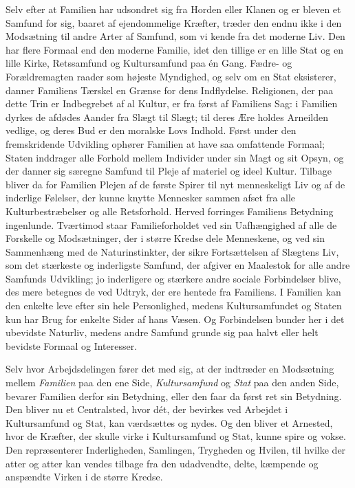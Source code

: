 \documentclass[12pt,a4paper]{article}
\begin{document}
Selv efter at Familien har udsondret sig fra Horden eller Klanen og er bleven
et Samfund for sig, baaret af ejendommelige Kræfter, træder den endnu ikke i
den Modsætning til andre Arter af Samfund, som vi kende fra det moderne Liv.
Den har flere Formaal end den moderne Familie, idet den tillige er en lille
Stat og en lille Kirke, Retssamfund og Kultursamfund paa én Gang. Fædre- og
Forældremagten raader som højeste Myndighed, og selv om en Stat eksisterer,
danner Familiens Tærskel en Grænse for dens Indflydelse. Religionen, der paa
dette Trin er Indbegrebet af al Kultur, er fra først af Familiens Sag: i
Familien dyrkes de afdødes Aander fra Slægt til Slægt; til deres Ære holdes
Arneilden vedlige, og deres Bud er den moralske Lovs Indhold. Først under den
fremskridende Udvikling ophører Familien at have saa omfattende Formaal;
Staten inddrager alle Forhold mellem Individer under sin Magt og sit Opsyn, og
der danner sig særegne Samfund til Pleje af materiel og ideel Kultur. Tilbage
bliver da for Familien Plejen af de første Spirer til nyt menneskeligt Liv og
af de inderlige Følelser, der kunne knytte Mennesker sammen afset fra alle
Kulturbestræbelser og alle Retsforhold. Herved forringes Familiens Betydning
ingenlunde. Tværtimod staar Familieforholdet ved sin Uafhængighed af alle de
Forskelle og Modsætninger, der i større Kredse dele Menneskene, og ved sin
Sammenhæng med de Naturinstinkter, der sikre Fortsættelsen af Slægtens Liv,
som det stærkeste og inderligste Samfund, der afgiver en Maalestok for alle
andre Samfunds Udvikling; jo inderligere og stærkere andre sociale
Forbindelser blive, des mere betegnes de ved Udtryk, der ere hentede fra
Familiens. I Familien kan den enkelte leve efter sin hele Personlighed, medens
Kultursamfundet og Staten kun har Brug for enkelte Sider af hans Væsen. Og
Forbindelsen bunder her i det ubevidste Naturliv, medens andre Samfund grunde
sig paa halvt eller helt bevidste Formaal og Interesser.

Selv hvor Arbejdsdelingen fører det med sig, at der indtræder en Modsætning
mellem \emph{Familien} paa den ene Side, \emph{Kultursamfund} og \emph{Stat} paa den anden Side,
bevarer Familien derfor sin Betydning, eller den faar da først ret sin
Betydning. Den bliver nu et Centralsted, hvor dét, der bevirkes ved Arbejdet i
Kultursamfund og Stat, kan værdsættes og nydes. Og den bliver et Arnested,
hvor de Kræfter, der skulle virke i Kultursamfund og Stat, kunne spire og
vokse. Den repræsenterer Inderligheden, Samlingen, Trygheden og Hvilen, til hvilke
der atter og atter kan vendes tilbage fra den udadvendte, delte, kæmpende og
anspændte Virken i de større Kredse.
\end{document}
